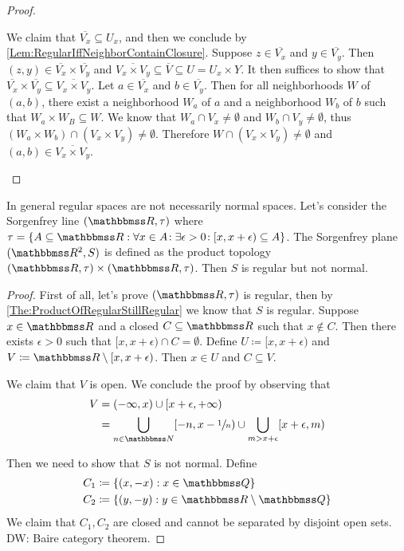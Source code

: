 \documentclass[screen,single]{techreport}
\numberwithin{equation}{section}
\newcommand{\diw}[1]{{\color{Red} DW: #1}}
\begin{document}
\begin{proof}
\begin{itemize}
		We claim that $\overline{V_x} \subseteq U_x$, and then we conclude by \cref{Lem:RegularIffNeighborContainClosure}.
		Suppose $z \in \overline{V_x}$ and $y \in \overline{V_y}$.
		Then $(z,y) \in \overline{V_x} \times \overline{V_y}$ and $\overline{V_x \times V_y} \subseteq \overline{V} \subseteq U = U_x \times Y$.
		It then suffices to show that $\overline{V_x} \times \overline{V_y} \subseteq \overline{V_x \times V_y}$.
		Let $a \in \overline{V_x}$ and $b \in \overline{V_y}$.
		Then for all neighborhoods $W$ of $(a,b)$, there exist a neighborhood $W_a$ of $a$ and a neighborhood $W_b$ of $b$ such that $W_a \times W_B \subseteq W$.
		We know that $W_a \cap V_x \neq \emptyset$ and $W_b \cap V_y \neq \emptyset$,
		thus $(W_a \times W_b) \cap (V_x \times V_y) \neq \emptyset$.
		Therefore $W \cap (V_x \times V_y) \neq \emptyset$ and $(a,b) \in \overline{V_x\times V_y}$.
	\end{itemize}
\end{proof}

\begin{example}\label{Exa:RegularNotImplyNormal}
	In general regular spaces are not necessarily normal spaces.
	Let's consider the Sorgenfrey line $(\bbR,\tau)$ where $\tau = \{ A \subseteq \bbR : \Forall{x \in A} \Exists{\epsilon > 0} [x,x+\epsilon) \subseteq A \}$.
	The Sorgenfrey plane $(\bbR^2,S)$ is defined as the product topology $(\bbR,\tau) \times (\bbR,\tau)$.
	Then $S$ is regular but not normal.
\end{example}
\begin{proof}
	First of all, let's prove $(\bbR,\tau)$ is regular, then by \cref{The:ProductOfRegularStillRegular} we know that $S$ is regular.
	Suppose $x \in \bbR$ and a closed $C \subseteq \bbR$ such that $x \not\in C$.
	Then there exists $\epsilon>0$ such that $[x,x+\epsilon) \cap C = \emptyset$.
	Define $U \coloneqq [x,x+\epsilon)$ and $V \coloneqq \bbR \setminus [x,x+\epsilon)$.
	Then $x \in U$ and $C \subseteq V$.
	
	We claim that $V$ is open. We conclude the proof by observing that
	\begin{align*}
		V & = (-\infty,x) \cup [x+\epsilon,+\infty) \\
		& = \bigcup_{n \in \bbN} [-n, x-\sfrac{1}{n}) \cup \bigcup_{m > x + \epsilon} [x+\epsilon,m)
	\end{align*}
	
	Then we need to show that $S$ is not normal.
	Define
	\begin{align*}
		C_1 & \coloneqq \{ (x,-x) : x \in \bbQ \} \\
		C_2 & \coloneqq \{ (y,-y) : y \in \bbR \setminus \bbQ \}
	\end{align*}
	We claim that $C_1,C_2$ are closed and cannot be separated by disjoint open sets.
	\diw{Baire category theorem.}
\end{proof}
\end{document}
